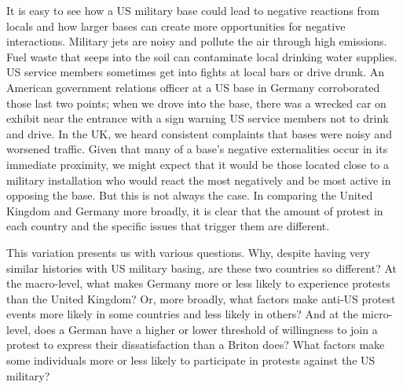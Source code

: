 		It is easy to see how a US military base could lead to negative reactions from locals and how larger bases can create more opportunities for negative interactions. Military jets are noisy and pollute the air through high emissions. Fuel waste that seeps into the soil can contaminate local drinking water supplies. US service members sometimes get into fights at local bars or drive drunk.\cite{kasernetwo20190725} An American government relations officer at a US base in Germany corroborated those last two points; when we drove into the base, there was a wrecked car on exhibit near the entrance with a sign warning US service members not to drink and drive. In the UK, we heard consistent complaints that bases were noisy and worsened traffic.
		Given that many of a base's negative externalities occur in its immediate proximity, we might expect that it would be those located close to a military installation who would react the most negatively and be most active in opposing the base. But this is not always the case. In comparing the United Kingdom and Germany more broadly, it is clear that the amount of protest in each country and the specific issues that trigger them are different. 
		
		This variation presents us with various questions. Why, despite having very similar histories with US military basing, are these two countries so different? At the macro-level, what makes Germany more or less likely to experience protests than the United Kingdom? Or, more broadly, what factors make anti-US protest events more likely in some countries and less likely in others? And at the micro-level, does a German have a higher or lower threshold of willingness to join a protest to express their dissatisfaction than a Briton does? What factors make some individuals more or less likely to participate in protests against the US military?
		
